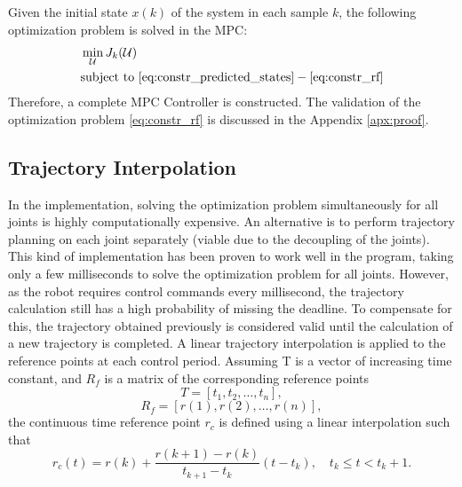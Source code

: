 \documentclass[final]{LTHtwocol} %
\begin{document}
Given the initial state $x(k)$ of the system in each sample $k$, the following optimization problem is solved in the MPC:
\begin{equation}
    \begin{split}
    \label{eq:optimization}
        &\min_{\mathcal{U}} J_k(\mathcal{U})\\
        &\text{subject to} \,\,\eqref{eq:constr_predicted_states}- \eqref{eq:constr_rf}
    \end{split}
\end{equation}
Therefore, a complete MPC Controller is constructed. The validation of the optimization problem \eqref{eq:constr_rf} is discussed in the Appendix \ref{apx:proof}.

\subsection{Trajectory Interpolation}
In the implementation, solving the optimization problem simultaneously for all joints is highly computationally expensive. An alternative is to perform trajectory planning on each joint separately (viable due to the decoupling of the joints). This kind of implementation has been proven to work well in the program, taking only a few milliseconds to solve the optimization problem for all joints. However, as the robot requires control commands every millisecond, the trajectory calculation still has a high probability of missing the deadline. To compensate for this, the trajectory obtained previously is considered valid until the calculation of a new trajectory is completed. A linear trajectory interpolation is applied to the reference points at each control period. Assuming T is a vector of increasing time constant, and $R_f$ is a matrix of the corresponding reference points
\begin{equation}
    T =[t_1,t_2,\dots,t_n],
\end{equation}
\begin{equation}
    R_f=[r(1),r(2),\dots,r(n)],
\end{equation}
 the continuous time reference point $r_c$ is defined using a linear interpolation such that
\begin{equation}
    r_c(t) = r(k) + \frac{r(k+1)-r(k)}{t_{k+1}-t_k}(t-t_k),\quad t_k\leq t<t_k+1.
\end{equation}
\end{document}
